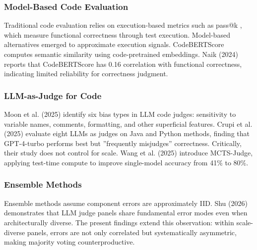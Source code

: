 
\subsubsection{Model-Based Code Evaluation}

Traditional code evaluation relies on execution-based metrics such as pass@k \citep{chen2021evaluating}, which measure functional correctness through test execution. Model-based alternatives emerged to approximate execution signals. CodeBERTScore \citep{zhou2023codebertscore} computes semantic similarity using code-pretrained embeddings. Naik (2024) reports that CodeBERTScore has 0.16 correlation with functional correctness, indicating limited reliability for correctness judgment.

\subsubsection{LLM-as-Judge for Code}

Moon et al. (2025) identify six bias types in LLM code judges: sensitivity to variable names, comments, formatting, and other superficial features. Crupi et al. (2025) evaluate eight LLMs as judges on Java and Python methods, finding that GPT-4-turbo performs best but ''frequently misjudges'' correctness. Critically, their study does not control for scale. Wang et al. (2025) introduce MCTS-Judge, applying test-time compute to improve single-model accuracy from 41\% to 80\%.

\subsubsection{Ensemble Methods}

Ensemble methods assume component errors are approximately IID. Shu (2026) demonstrates that LLM judge panels share fundamental error modes even when architecturally diverse. The present findings extend this observation: within scale-diverse panels, errors are not only correlated but systematically asymmetric, making majority voting counterproductive.

